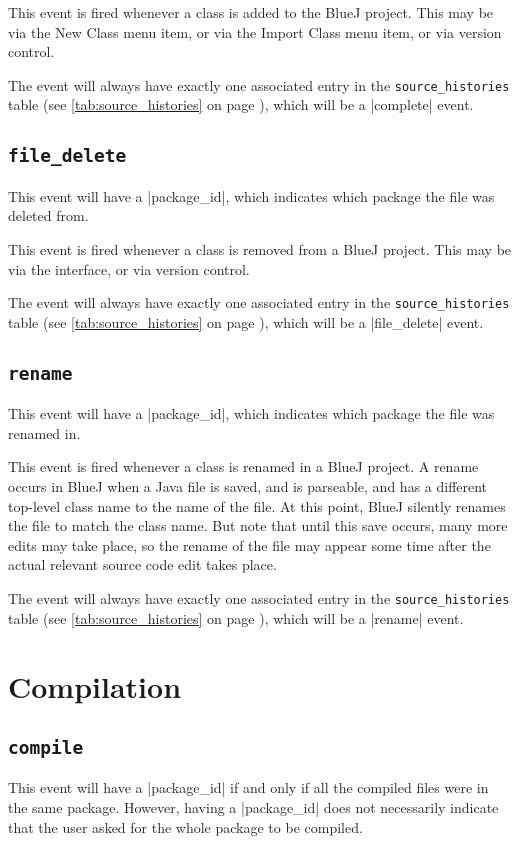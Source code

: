 \documentclass{book}
\newcommand{\myref}[1]{\autoref{#1} on page \pageref*{#1}}
\newcommand{\tabref}[1]{\lstinline|#1| table (see \myref{tab:#1})}
\begin{document}
This event is fired whenever a class is added to the BlueJ project.  This may
be via the New Class menu item, or via the Import Class menu item, or via
version control.

The event will always have exactly one associated entry in the
\tabref{source_histories}, which will be a |complete| event.

\subsection{\lstinline|file_delete|}

This event will have a |package_id|, which indicates which package the file
was deleted from.

This event is fired whenever a class is removed from a BlueJ project.  This
may be via the interface, or via version control.

The event will always have exactly one associated entry in the
\tabref{source_histories}, which will be a |file_delete| event.

\subsection{\lstinline|rename|}

This event will have a |package_id|, which indicates which package the file
was renamed in.

This event is fired whenever a class is renamed in a BlueJ project.  A rename
occurs in BlueJ when a Java file is saved, and is parseable, and has a
different top-level class name to the name of the file.  At this point, BlueJ
silently renames the file to match the class name.  But note that until this
save occurs, many more edits may take place, so the rename of the file may
appear some time after the actual relevant source code edit takes place.

The event will always have exactly one associated entry in the
\tabref{source_histories}, which will be a |rename| event.

\section{Compilation}

\subsection{\lstinline|compile|}

This event will have a |package_id| if and only if all the compiled files were
in the same package.  However, having a |package_id| does not necessarily
indicate that the user asked for the whole package to be compiled.
\end{document}
